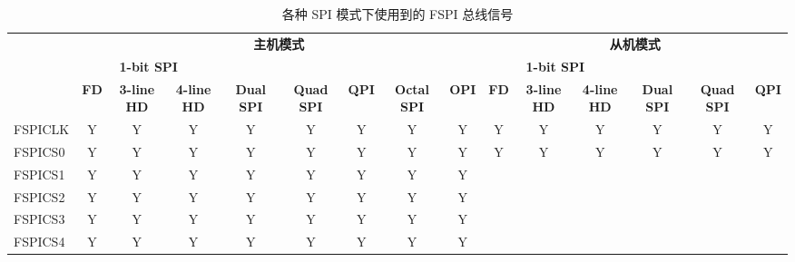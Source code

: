 \documentclass[main\_\_CN.tex]{subfiles}
\begin{document}
\begin{landscape}
\begin{table}[H]
    \centering
    \caption{各种 SPI 模式下使用到的 FSPI 总线信号}
    \label{tab:fspi-bus-singals-used-in-various-spi-modes}

    \begin{threeparttable}
    \begin{tabular}{ |p{2.0cm} |c|c|c|c|c|c|c|c|c|c|c|c|c|c| }
    \hline
        \rowcolor{lightgray}
        & \multicolumn{8}{c|}{\textbf{主机模式}} & \multicolumn{6}{c|}{\textbf{从机模式}} \\\cline{2-15}
        \rowcolor{lightgray}
        & \multicolumn{3}{c|}{\textbf{1-bit SPI}} & & & & & & \multicolumn{3}{c|}{\textbf{1-bit SPI}} & & & \\ \cline{2-4} \cline{10-12}
        \rowcolor{lightgray}
        \multirow{-3}{*}{\textbf{FSPI 总线信号}} & \textbf{FD\tnote{1}} & \textbf{3-line HD\tnote{2}} & \textbf{4-line HD} & \multirow{-2}{*}{\textbf{Dual SPI}} & \multirow{-2}{*}{\textbf{Quad SPI}} & \multirow{-2}{*}{\textbf{QPI}} & \multirow{-2}{*}{\textbf{Octal SPI}} & \multirow{-2}{*}{\textbf{OPI}} & \textbf{FD} & \textbf{3-line HD} & \textbf{4-line HD} & \multirow{-2}{*}{\textbf{Dual SPI}} & \multirow{-2}{*}{\textbf{Quad SPI}} & \multirow{-2}{*}{\textbf{QPI}} \\ \hline
FSPICLK                  & Y       & Y       & Y       & Y       & Y       & Y      & Y       & Y      & Y       & Y      & Y       & Y       & Y       & Y      \\ \hline
FSPICS0                  & Y       & Y       & Y       & Y       & Y       & Y      & Y       & Y      & Y       & Y      & Y       & Y       & Y       & Y      \\ \hline
FSPICS1                  & Y       & Y       & Y       & Y       & Y       & Y      & Y       & Y      &         &        &         &         &         &        \\ \hline
FSPICS2                  & Y       & Y       & Y       & Y       & Y       & Y      & Y       & Y      &         &        &         &         &         &        \\ \hline
FSPICS3                  & Y       & Y       & Y       & Y       & Y       & Y      & Y       & Y      &         &        &         &         &         &        \\ \hline
FSPICS4                  & Y       & Y       & Y       & Y       & Y       & Y      & Y       & Y      &         &        &         &         &         &        \\ \hline

\end{tabular}
\end{threeparttable}
\end{table}
\end{landscape}
\end{document}
